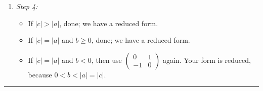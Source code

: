 \documentclass[11pt]{article}
\theoremstyle{definition}
\theoremstyle{named}
\begin{document}
\begin{enumerate}
\begin{enumerate}
        \item \textit{Step 4: }
        \begin{itemize}
            \item If $|c| > |a|$, done; we have a reduced form. 
            \item If $|c| = |a|$ and $b \geq 0$, done; we have a reduced form. 
            \item If $|c| = |a|$ and $b < 0$, then use $\begin{pmatrix}
                0 & 1 \\
                -1 & 0
            \end{pmatrix}$ again. Your form is reduced, because $0 < b < |a| = |c|$. 
        \end{itemize}
    \end{enumerate}
    \begin{center}
        \hrule
    \end{center}
\end{enumerate}
\end{document}
